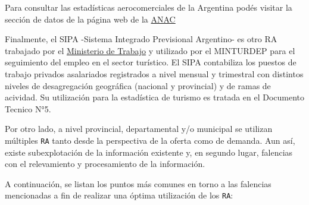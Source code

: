 \documentclass[
]{book}
\begin{document}
Para consultar las estadísticas aerocomerciales de la Argentina podés visitar la sección de datos de la página web de la \href{https://datos.anac.gob.ar/estadisticas/}{ANAC}

Finalmente, el SIPA -Sistema Integrado Previsional Argentino- es otro RA trabajado por el \href{http://www.trabajo.gob.ar/estadisticas/}{Ministerio de Trabajo} y utilizado por el MINTURDEP para el seguimiento del empleo en el sector turístico. El SIPA contabiliza los puestos de trabajo privados asalariados registrados a nivel mensual y trimestral con distintos niveles de desagregación geográfica (nacional y provincial) y de ramas de acividad. Su utilización para la estadística de turismo es tratada en el Documento Tecnico N°5.

Por otro lado, a nivel provincial, departamental y/o municipal se utilizan múltiples \texttt{RA} tanto desde la perspectiva de la oferta como de demanda. Aun así, existe subexplotación de la información existente y, en segundo lugar, falencias con el relevamiento y procesamiento de la información.

A continuación, se listan los puntos más comunes en torno a las falencias mencionadas a fin de realizar una óptima utilización de los \texttt{RA}:
\end{document}
